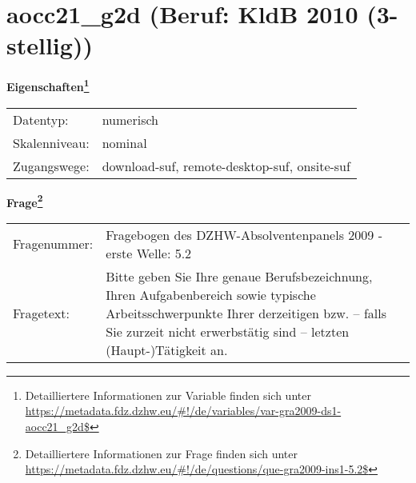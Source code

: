 
    \setcounter{footnote}{0}

    \vspace*{-1.8cm}
	\section{aocc21\_g2d (Beruf: KldB 2010 (3-stellig))}
	\label{section:aocc21_g2d}



    \vspace*{0.5cm}
    \noindent\textbf{Eigenschaften\footnote{Detailliertere Informationen zur Variable finden sich unter
		\url{https://metadata.fdz.dzhw.eu/\#!/de/variables/var-gra2009-ds1-aocc21_g2d$}}}\\
	\begin{tabularx}{\hsize}{@{}lX}
	Datentyp: & numerisch \\
	Skalenniveau: & nominal \\
	Zugangswege: &
	  download-suf, 
	  remote-desktop-suf, 
	  onsite-suf
 \\
    \end{tabularx}



				\vspace*{0.5cm}
                \noindent\textbf{Frage\footnote{Detailliertere Informationen zur Frage finden sich unter
		              \url{https://metadata.fdz.dzhw.eu/\#!/de/questions/que-gra2009-ins1-5.2$}}}\\
				\begin{tabularx}{\hsize}{@{}lX}
					Fragenummer: &
					  Fragebogen des DZHW-Absolventenpanels 2009 - erste Welle:
					  5.2
 \\
					Fragetext: & Bitte geben Sie Ihre genaue Berufsbezeichnung, Ihren Aufgabenbereich sowie typische Arbeitsschwerpunkte Ihrer derzeitigen bzw. – falls Sie zurzeit nicht erwerbstätig sind – letzten (Haupt-)Tätigkeit an. \\
				\end{tabularx}






